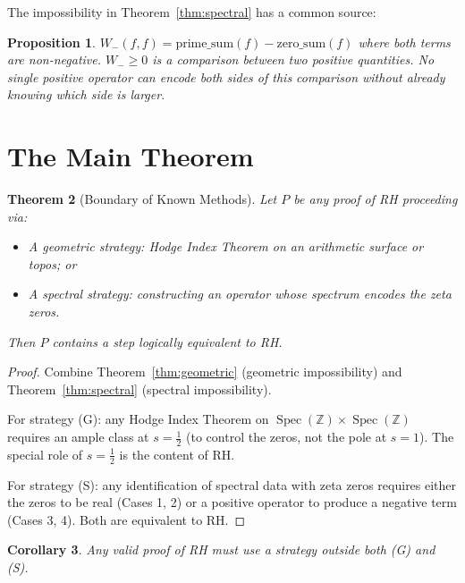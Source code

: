 \documentclass[12pt]{article}
\newtheorem{theorem}{Theorem}[section]
\newtheorem{proposition}[theorem]{Proposition}
\newtheorem{corollary}[theorem]{Corollary}
\DeclareMathOperator{\Spec}{Spec}
\newcommand{\ZZ}{\mathbb{Z}}
\begin{document}
The impossibility in Theorem~\ref{thm:spectral} has a common source:

\begin{proposition}
$W_-(f,f) = \text{prime\_sum}(f) - \text{zero\_sum}(f)$ where both terms
are non-negative. $W_- \geq 0$ is a comparison between two positive
quantities. No single positive operator can encode both sides of this
comparison without already knowing which side is larger.
\end{proposition}

\section{The Main Theorem}

\begin{theorem}[Boundary of Known Methods]
\label{thm:main}
Let $P$ be any proof of RH proceeding via:
\begin{itemize}
\item[(G)] A geometric strategy: Hodge Index Theorem on an arithmetic
surface or topos; or
\item[(S)] A spectral strategy: constructing an operator whose spectrum
encodes the zeta zeros.
\end{itemize}
Then $P$ contains a step logically equivalent to RH.
\end{theorem}

\begin{proof}
Combine Theorem~\ref{thm:geometric} (geometric impossibility) and
Theorem~\ref{thm:spectral} (spectral impossibility).

For strategy (G): any Hodge Index Theorem on $\Spec(\ZZ) \times \Spec(\ZZ)$
requires an ample class at $s = \frac{1}{2}$ (to control the zeros, not the
pole at $s=1$). The special role of $s = \frac{1}{2}$ is the content of RH.

For strategy (S): any identification of spectral data with zeta zeros
requires either the zeros to be real (Cases 1, 2) or a positive operator
to produce a negative term (Cases 3, 4). Both are equivalent to RH.
\end{proof}

\begin{corollary}
Any valid proof of RH must use a strategy outside both (G) and (S).
\end{corollary}
\end{document}
